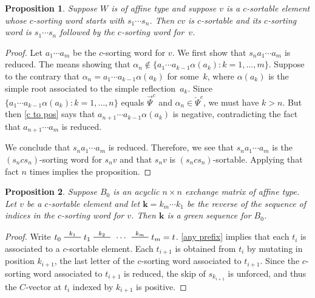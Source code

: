 \documentclass{amsart}
\newtheorem{proposition}{Proposition}[section]
\theoremstyle{definition}
\theoremstyle{remark}
\numberwithin{equation}{section}
\newcommand{\edge}{\,\,\rule[2.7pt]{20pt}{0.5pt}\,\,}
\newcommand{\set}[1]{{\lbrace #1 \rbrace}}
\newcommand{\0}{{\mathbf{0}}}
\newcommand{\kk}{\mathbf{k}}
\newcommand{\TravInfChar}{\Psi}
\newcommand{\TravProj}[1]{\overrightarrow{\TravInfChar}^{#1}}
\newcommand{\TravInj}[1]{\overleftarrow{\TravInfChar}^{#1}}
\begin{document}
\begin{proposition}\label{tack on c}
Suppose $W$ is of affine type and suppose $v$ is a $c$-sortable element whose $c$-sorting word starts with $s_1\cdots s_n$.
Then $cv$ is $c$-sortable and its $c$-sorting word is $s_1\cdots s_n$ followed by the $c$-sorting word for~$v$.
\end{proposition}
\begin{proof}
Let $a_1\cdots a_m$ be the $c$-sorting word for $v$.
We first show that $s_na_1\cdots a_m$ is reduced.
The means showing that $\alpha_n\not\in\set{a_1\cdots a_{k-1}\alpha(a_k):k=1,\ldots,m}$.
Suppose to the contrary that $\alpha_n=a_1\cdots a_{k-1}\alpha(a_k)$ for some~$k$, where $\alpha(a_k)$ is the simple root associated to the simple reflection~$a_k$.
Since $\set{a_1\cdots a_{k-1}\alpha(a_k):k=1,\ldots,n}$ equals $\TravProj{c}$ and $\alpha_n\in \TravInj{c}$, we must have $k>n$.
But then \cref{c to pos} says that $a_{n+1}\cdots a_{k-1}\alpha(a_k)$ is negative, contradicting the fact that $a_{n+1}\cdots a_m$ is reduced.

We conclude that $s_na_1\cdots a_m$ is reduced.
Therefore, we see that $s_na_1\cdots a_m$ is the $(s_ncs_n)$-sorting word for $s_nv$ and that $s_nv$ is $(s_ncs_n)$-sortable.
Applying that fact $n$ times implies the proposition.
\end{proof}

\begin{proposition}\label{sort green}
Suppose $B_0$ is an acyclic $n\times n$ exchange matrix of affine type.
Let $v$ be a $c$-sortable element and let $\kk=k_m\cdots k_1$ be the \emph{reverse} of the sequence of indices in the $c$-sorting word for $v$.
Then $\kk$ is a green sequence for $B_0$.
\end{proposition}
\begin{proof}
Write $t_0\overset{k_1}{\edge}t_1\overset{k_2}{\edge}\,\cdots\,\overset{k_m}{\edge}t_m=t$.
\cref{any prefix} implies that each $t_i$ is associated to a $c$-sortable element.
Each $t_{i+1}$ is obtained from $t_i$ by mutating in position $k_{i+1}$, the last letter of the $c$-sorting word associated to $t_{i+1}$.
Since the $c$-sorting word associated to $t_{i+1}$ is reduced, the skip of $s_{k_{i+1}}$ is unforced, and thus the $C$-vector at $t_i$ indexed by $k_{i+1}$ is positive.
\end{proof}
\end{document}
